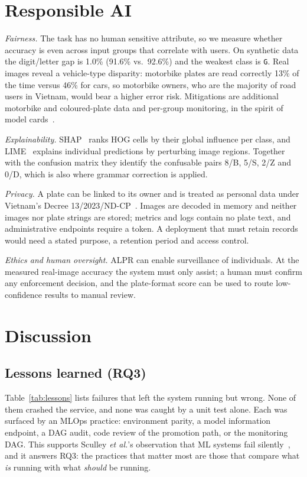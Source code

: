 \documentclass[conference]{IEEEtran}
\newcommand{\code}[1]{\texttt{#1}}
\begin{document}
\section{Responsible AI}\label{sec:rai}
\textit{Fairness.} The task has no human sensitive attribute, so we measure
whether accuracy is even across input groups that correlate with users. On
synthetic data the digit/letter gap is 1.0\% (91.6\% vs.\ 92.6\%) and the weakest
class is \code{G}. Real images reveal a vehicle-type disparity: motorbike plates
are read correctly 13\% of the time versus 46\% for cars, so motorbike owners, who
are the majority of road users in Vietnam, would bear a higher error risk.
Mitigations are additional motorbike and coloured-plate data and per-group
monitoring, in the spirit of model cards~\cite{mitchell2019modelcards}.

\textit{Explainability.} SHAP~\cite{lundberg2017shap} ranks HOG cells by their
global influence per class, and LIME~\cite{ribeiro2016lime} explains individual
predictions by perturbing image regions. Together with the confusion matrix they
identify the confusable pairs 8/B, 5/S, 2/Z and 0/D, which is also where grammar
correction is applied.

\textit{Privacy.} A plate can be linked to its owner and is treated as personal
data under Vietnam's Decree 13/2023/ND-CP~\cite{decree13}. Images are decoded in
memory and neither images nor plate strings are stored; metrics and logs contain
no plate text, and administrative endpoints require a token. A deployment that
must retain records would need a stated purpose, a retention period and access
control.

\textit{Ethics and human oversight.} ALPR can enable surveillance of individuals.
At the measured real-image accuracy the system must only assist; a human must
confirm any enforcement decision, and the plate-format score can be used to route
low-confidence results to manual review.

\section{Discussion}\label{sec:disc}
\subsection{Lessons learned (RQ3)}
Table~\ref{tab:lessons} lists failures that left the system running but wrong.
None of them crashed the service, and none was caught by a unit test alone. Each
was surfaced by an MLOps practice: environment parity, a model information
endpoint, a DAG audit, code review of the promotion path, or the monitoring DAG.
This supports Sculley \emph{et al.}'s observation that ML systems fail
silently~\cite{sculley2015debt}, and it answers RQ3: the practices that matter
most are those that compare what \emph{is} running with what \emph{should} be
running.
\end{document}
